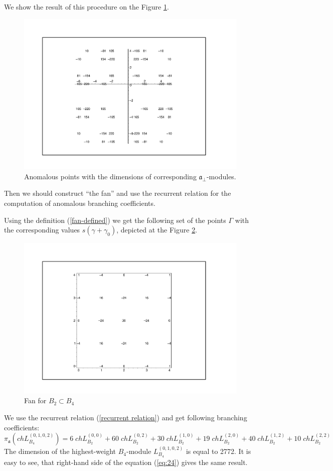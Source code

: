 \documentclass[a4paper,12pt]{article}
\theoremstyle{definition} \newtheorem{Def}{Definition}
\begin{document}
We show the result of this procedure on the Figure \ref{fig:B4B2anom}.
\begin{figure}[h!tb]
    \includegraphics[width=130mm]{B4_B2_anom_points.pdf}
  \caption{Anomalous points with the dimensions of corresponding $\mathfrak{a}_{\bot}$-modules.}
  \label{fig:B4B2anom}
\end{figure}

Then we should construct ``the fan'' and use the recurrent relation for the computation of anomalous branching coefficients.

Using the definition (\ref{fan-defined}) we get the following set of
the points $\Gamma$ with the corresponding values $s(\gamma+\gamma_0)$, depicted at the Figure \ref{fig:B4B2Fan}.
\begin{figure}[h!tb]
  \includegraphics[width=130mm]{B4_B2_fan.pdf}
  \caption{Fan for $B_2\subset B_4$}
  \label{fig:B4B2Fan}
\end{figure}
We use the recurrent relation (\ref{recurrent relation}) and get
following branching coefficients:
\begin{equation}
  \label{eq:24}
  \pi_{\mathfrak{a}} \left(ch L^{(0,1,0,2)}_{B_4}\right) = 6 \; ch L^{(0,0)}_{B_2}+ 60
  \; ch L_{B_2}^{(0,2)}+ 30 \; ch L_{B_2}^{(1,0)}+ 19 \; ch L_{B_2}^{(2,0)}+
  40 \; ch L_{B_2}^{(1,2)}+ 10 \; ch L_{B_2}^{(2,2)}
\end{equation}
The dimension of the highest-weight $B_4$-module $L^{(0,1,0,2)}_{B_4}$
is equal to 2772. It is easy to see, that right-hand side of the
equation (\ref{eq:24}) gives the same result.
\end{document}

